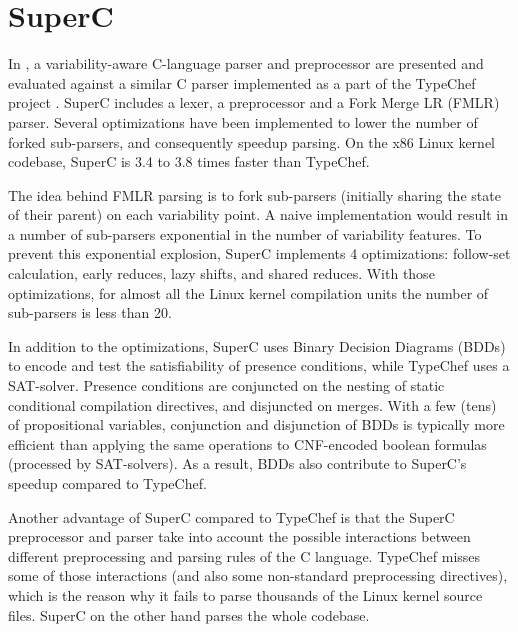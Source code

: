 \documentclass[11pt]{article}
\begin{document}
\section{SuperC}
In \cite{Gazzillo:2012}, a variability-aware C-language parser and preprocessor are presented and evaluated against a similar C parser implemented as a part of the TypeChef project \cite{Kastner:2011}. SuperC includes a lexer, a preprocessor and a Fork Merge LR (FMLR) parser. Several optimizations have been implemented to lower the number of forked sub-parsers, and consequently speedup parsing. On the x86 Linux kernel codebase, SuperC is 3.4 to 3.8 times faster than TypeChef.

The idea behind FMLR parsing is to fork sub-parsers (initially sharing the state of their parent) on each variability point. A naive implementation would result in a number of sub-parsers exponential in the number of variability features. To prevent this exponential explosion, SuperC implements 4 optimizations: follow-set calculation, early reduces, lazy shifts, and shared reduces. With those optimizations, for almost all the Linux kernel compilation units the number of sub-parsers is less than 20.

In addition to the optimizations, SuperC uses Binary Decision Diagrams (BDDs) to encode and test the satisfiability of presence conditions, while TypeChef uses a SAT-solver. Presence conditions are conjuncted on the nesting of static conditional compilation directives, and disjuncted on merges. With a few (tens) of propositional variables, conjunction and disjunction of BDDs is typically more efficient than applying the same operations to CNF-encoded boolean formulas (processed by SAT-solvers). As a result, BDDs also contribute to SuperC's speedup compared to TypeChef.

Another advantage of SuperC compared to TypeChef is that the SuperC preprocessor and parser take into account the possible interactions between different preprocessing and parsing rules of the C language. TypeChef misses some of those interactions (and also some non-standard preprocessing directives), which is the reason why it fails to parse thousands of the Linux kernel source files. SuperC on the other hand parses the whole codebase.


 
\end{document}
